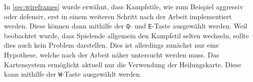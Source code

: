 In \autoref{sec:wireframes} wurde erwähnt, dass Kampfstile, wie zum Beispiel aggressiv oder defensiv, erst in einem weiteren Schritt nach der Arbeit implementiert werden. Diese können dann mithilfe der \texttt{Q}- und \texttt{E}-Taste ausgewählt werden. Weil beobachtet wurde, dass Spielende allgemein den Kampfstil selten wechseln, sollte dies auch kein Problem darstellen. Dies ist allerdings zunächst nur eine Hypothese, welche nach der Arbeit näher untersucht werden muss. Das Kartensystem ermöglicht aktuell nur die Verwendung der Heilungskarte. Diese kann mithilfe der \texttt{W}-Taste ausgewählt werden.
